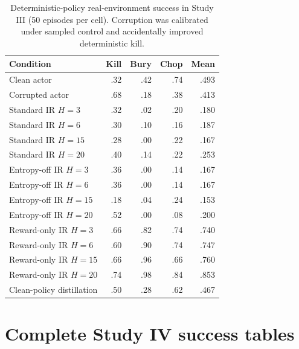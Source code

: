 \documentclass[10pt]{article}
\begin{document}
\begin{table}[H]
\centering
\scriptsize
\caption{Deterministic-policy real-environment success in Study III (50 episodes per cell). Corruption was calibrated under sampled control and accidentally improved deterministic kill.}
\begin{tabular}{lrrrr}
\toprule
Condition & Kill & Bury & Chop & Mean \\
\midrule
Clean actor & .32 & .42 & .74 & .493 \\
Corrupted actor & .68 & .18 & .38 & .413 \\
Standard IR $H=3$ & .32 & .02 & .20 & .180 \\
Standard IR $H=6$ & .30 & .10 & .16 & .187 \\
Standard IR $H=15$ & .28 & .00 & .22 & .167 \\
Standard IR $H=20$ & .40 & .14 & .22 & .253 \\
Entropy-off IR $H=3$ & .36 & .00 & .14 & .167 \\
Entropy-off IR $H=6$ & .36 & .00 & .14 & .167 \\
Entropy-off IR $H=15$ & .18 & .04 & .24 & .153 \\
Entropy-off IR $H=20$ & .52 & .00 & .08 & .200 \\
Reward-only IR $H=3$ & .66 & .82 & .74 & .740 \\
Reward-only IR $H=6$ & .60 & .90 & .74 & .747 \\
Reward-only IR $H=15$ & .66 & .96 & .66 & .760 \\
Reward-only IR $H=20$ & .74 & .98 & .84 & .853 \\
Clean-policy distillation & .50 & .28 & .62 & .467 \\
\bottomrule
\end{tabular}
\end{table}

\section{Complete Study IV success tables}
\end{document}
